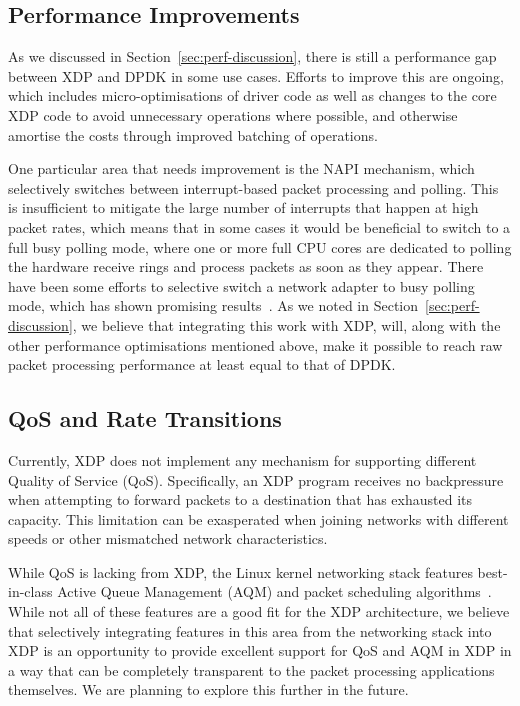 \documentclass[10pt,sigconf]{acmart}
\begin{document}
\subsection{Performance Improvements}
\label{sec:improvements-napi}
As we discussed in Section~\ref{sec:perf-discussion}, there is still a
performance gap between XDP and DPDK in some use cases. Efforts to improve this
are ongoing, which includes micro-optimisations of driver code as well as
changes to the core XDP code to avoid unnecessary operations where possible, and
otherwise amortise the costs through improved batching of operations.

One particular area that needs improvement is the NAPI mechanism, which
selectively switches between interrupt-based packet processing and polling. This
is insufficient to mitigate the large number of interrupts that happen at high
packet rates, which means that in some cases it would be beneficial to switch to
a full busy polling mode, where one or more full CPU cores are dedicated to
polling the hardware receive rings and process packets as soon as they appear.
There have been some efforts to selective switch a network adapter to busy
polling mode, which has shown promising results~\cite{dumazet17:_busyp}. As we
noted in Section~\ref{sec:perf-discussion}, we believe that integrating this
work with XDP, will, along with the other performance optimisations mentioned
above, make it possible to reach raw packet processing performance at least
equal to that of DPDK.

\subsection{QoS and Rate Transitions}
\label{sec:handl-rate-trans}
Currently, XDP does not implement any mechanism for supporting different Quality
of Service (QoS). Specifically, an XDP program receives no backpressure when
attempting to forward packets to a destination that has exhausted its capacity.
This limitation can be exasperated when joining networks with different speeds
or other mismatched network characteristics.

While QoS is lacking from XDP, the Linux kernel networking stack features
best-in-class Active Queue Management (AQM) and packet scheduling
algorithms~\cite{good-bad-wifi}. While not all of these features are a good fit
for the XDP architecture, we believe that selectively integrating features in
this area from the networking stack into XDP is an opportunity to provide
excellent support for QoS and AQM in XDP in a way that can be completely
transparent to the packet processing applications themselves. We are planning to
explore this further in the future.
\end{document}
